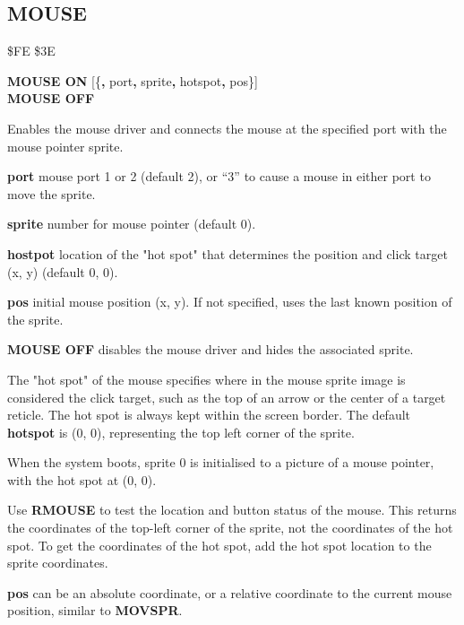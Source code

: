 \subsection{MOUSE}
\begin{description}[leftmargin=2cm,style=nextline]
\item [Token:]    \$FE \$3E

\item [Format:]   {\bf MOUSE ON} [\{{\bf,} port{\bf,} sprite{\bf,} hotspot{\bf,} pos\}] \\
                  {\bf MOUSE OFF}

\item [Usage:]    Enables the mouse driver and connects the mouse at the specified port with the mouse pointer sprite.

                  {\bf port} mouse port 1 or 2 (default 2), or ``3'' to cause a mouse in either port to move the sprite.

                  {\bf sprite} number for mouse pointer (default 0).

                  {\bf hostpot} location of the "hot spot" that determines the position and click target (x, y) (default 0, 0).

                  {\bf pos} initial mouse position (x, y). If not specified, uses the last known position of the sprite.

                  {\bf MOUSE OFF} disables the mouse driver and hides the associated sprite.

\item [Remarks:]  The "hot spot" of the mouse specifies where in the mouse sprite image is considered the click target, such as the top of an arrow or the center of a target reticle. The hot spot is always kept within the screen border. The default {\bf hotspot} is (0, 0), representing the top left corner of the sprite.

                  When the system boots, sprite 0 is initialised to a picture of a mouse pointer, with the hot spot at (0, 0).

                  Use {\bf RMOUSE} to test the location and button status of the mouse. This returns the coordinates of the top-left corner of the sprite, not the coordinates of the hot spot. To get the coordinates of the hot spot, add the hot spot location to the sprite coordinates.

                  {\bf pos} can be an absolute coordinate, or a relative coordinate to the current mouse position, similar to {\bf MOVSPR}.


\end{description}
